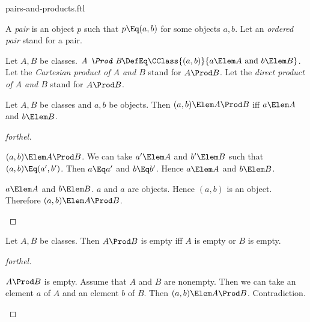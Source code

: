 \documentclass{stex}
\begin{document}
\begin{smodule}{pairs-and-products.ftl}




\begin{definition*}[forthel,for=ordered pair]
  A \emph{pair} is an object $p$ such that $p \Eq (a, b)$ for some objects $a, b$.
  Let an \emph{ordered pair} stand for a pair.
\end{definition*}

\begin{definition*}[forthel,for={Prod,Cartesian product,direct product}]
  Let $A, B$ be classes.
  $\emph{A \Prod B} \DefEq \CClass{(a, b)}{a \Elem A\text{ and }b \Elem B}$.
  Let the \emph{Cartesian product of $A$ and $B$} stand for $A \Prod B$.
  Let the \emph{direct product of $A$ and $B$} stand for $A \Prod B$.
\end{definition*}

\begin{proposition*}[forthel]
  Let $A, B$ be classes and $a, b$ be objects.
  Then $(a, b) \Elem A \Prod B$ iff $a \Elem A$ and $b \Elem B$.
\end{proposition*}
\begin{proof}[forthel]
  \begin{case}{$(a, b) \Elem A \Prod B$.}
    We can take $a' \Elem A$ and $b' \Elem B$ such that $(a, b) \Eq (a', b')$.
    Then $a \Eq a'$ and $b \Eq b'$.
    Hence $a \Elem A$ and $b \Elem B$.
  \end{case}

  \begin{case}{$a \Elem A$ and $b \Elem B$.}
    $a$ and $a$ are objects.
    Hence $(a, b)$ is an object.
    Therefore $(a, b) \Elem A \Prod B$.
  \end{case}
\end{proof}

\begin{proposition*}[forthel]
  Let $A, B$ be classes.
  Then $A \Prod B$ is empty iff $A$ is empty or $B$ is empty.
\end{proposition*}
\begin{proof}[forthel]
  \begin{case}{$A \Prod B$ is empty.}
    Assume that $A$ and $B$ are nonempty.
    Then we can take an element $a$ of $A$ and an element $b$ of $B$.
    Then $(a, b) \Elem A \Prod B$.
    Contradiction.
  \end{case}


\end{proof}
\end{smodule}
\end{document}
